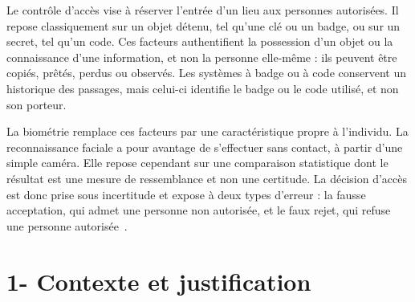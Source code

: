 \introduction
{}

Le contrôle d'accès vise à réserver l'entrée d'un lieu aux personnes autorisées. Il repose classiquement sur un objet détenu, tel qu'une clé ou un badge, ou sur un secret, tel qu'un code. Ces facteurs authentifient la possession d'un objet ou la connaissance d'une information, et non la personne elle-même : ils peuvent être copiés, prêtés, perdus ou observés. Les systèmes à badge ou à code conservent un historique des passages, mais celui-ci identifie le badge ou le code utilisé, et non son porteur.

La biométrie remplace ces facteurs par une caractéristique propre à l'individu. La reconnaissance faciale a pour avantage de s'effectuer sans contact, à partir d'une simple caméra. Elle repose cependant sur une comparaison statistique dont le résultat est une mesure de ressemblance et non une certitude. La décision d'accès est donc prise sous incertitude et expose à deux types d'erreur : la fausse acceptation, qui admet une personne non autorisée, et le faux rejet, qui refuse une personne autorisée~\cite{nist_far,nist_frr}.

\section*{1- Contexte et justification}

